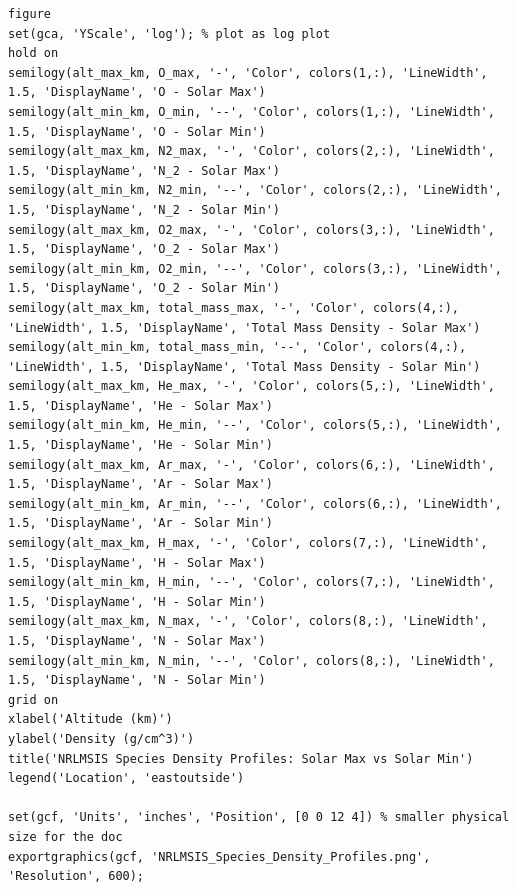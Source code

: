 \documentclass[11pt]{article}
\begin{document}
\begin{lstlisting}
figure
set(gca, 'YScale', 'log'); % plot as log plot
hold on
semilogy(alt_max_km, O_max, '-', 'Color', colors(1,:), 'LineWidth', 1.5, 'DisplayName', 'O - Solar Max')
semilogy(alt_min_km, O_min, '--', 'Color', colors(1,:), 'LineWidth', 1.5, 'DisplayName', 'O - Solar Min')
semilogy(alt_max_km, N2_max, '-', 'Color', colors(2,:), 'LineWidth', 1.5, 'DisplayName', 'N_2 - Solar Max')
semilogy(alt_min_km, N2_min, '--', 'Color', colors(2,:), 'LineWidth', 1.5, 'DisplayName', 'N_2 - Solar Min')
semilogy(alt_max_km, O2_max, '-', 'Color', colors(3,:), 'LineWidth', 1.5, 'DisplayName', 'O_2 - Solar Max')
semilogy(alt_min_km, O2_min, '--', 'Color', colors(3,:), 'LineWidth', 1.5, 'DisplayName', 'O_2 - Solar Min')
semilogy(alt_max_km, total_mass_max, '-', 'Color', colors(4,:), 'LineWidth', 1.5, 'DisplayName', 'Total Mass Density - Solar Max')
semilogy(alt_min_km, total_mass_min, '--', 'Color', colors(4,:), 'LineWidth', 1.5, 'DisplayName', 'Total Mass Density - Solar Min')
semilogy(alt_max_km, He_max, '-', 'Color', colors(5,:), 'LineWidth', 1.5, 'DisplayName', 'He - Solar Max')
semilogy(alt_min_km, He_min, '--', 'Color', colors(5,:), 'LineWidth', 1.5, 'DisplayName', 'He - Solar Min')
semilogy(alt_max_km, Ar_max, '-', 'Color', colors(6,:), 'LineWidth', 1.5, 'DisplayName', 'Ar - Solar Max')
semilogy(alt_min_km, Ar_min, '--', 'Color', colors(6,:), 'LineWidth', 1.5, 'DisplayName', 'Ar - Solar Min')
semilogy(alt_max_km, H_max, '-', 'Color', colors(7,:), 'LineWidth', 1.5, 'DisplayName', 'H - Solar Max')
semilogy(alt_min_km, H_min, '--', 'Color', colors(7,:), 'LineWidth', 1.5, 'DisplayName', 'H - Solar Min')
semilogy(alt_max_km, N_max, '-', 'Color', colors(8,:), 'LineWidth', 1.5, 'DisplayName', 'N - Solar Max')
semilogy(alt_min_km, N_min, '--', 'Color', colors(8,:), 'LineWidth', 1.5, 'DisplayName', 'N - Solar Min')
grid on
xlabel('Altitude (km)')
ylabel('Density (g/cm^3)')
title('NRLMSIS Species Density Profiles: Solar Max vs Solar Min')
legend('Location', 'eastoutside')

set(gcf, 'Units', 'inches', 'Position', [0 0 12 4]) % smaller physical size for the doc
exportgraphics(gcf, 'NRLMSIS_Species_Density_Profiles.png', 'Resolution', 600);
\end{lstlisting}

\newpage
\end{document}
